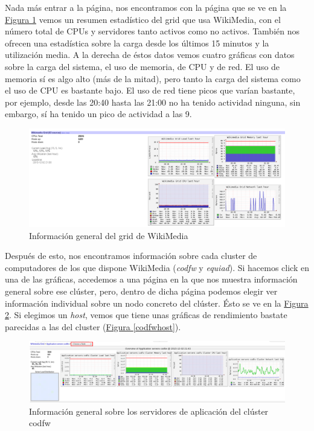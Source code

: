 \documentclass[10pt,a4paper,spanish]{article}
\numberwithin{equation}{section} %
\numberwithin{figure}{section} %
\numberwithin{table}{section} %
\begin{document}
Nada más entrar a la página, nos encontramos con la página que se ve en la \hyperref[wikimediainfo]{Figura \ref*{wikimediainfo}} vemos un resumen estadístico del grid que usa WikiMedia, con el número total de CPUs y servidores tanto activos como no activos. También nos ofrecen una estadística sobre la carga desde los últimos 15 minutos y la utilización media. A la derecha de éstos datos vemos cuatro gráficas con datos sobre la carga del sistema, el uso de memoria, de CPU y de red. El uso de memoria sí es algo alto (más de la mitad), pero tanto la carga del sistema como el uso de CPU es bastante bajo. El uso de red tiene picos que varían bastante, por ejemplo, desde las 20:40 hasta las 21:00 no ha tenido actividad ninguna, sin embargo, sí ha tenido un pico de actividad a las 9.

\begin{figure}[!h]
    \centering
    \includegraphics[width=1\textwidth]{3_50}
    \caption{Información general del grid de WikiMedia}
    \label{wikimediainfo}
\end{figure}

Después de esto, nos encontramos información sobre cada cluster de computadores de los que dispone WikiMedia (\textit{codfw} y \textit{equiad}). Si hacemos click en una de las gráficas, accedemos a una página en la que nos muestra información general sobre ese clúster, pero, dentro de dicha página podemos elegir ver información individual sobre un nodo concreto del clúster. Ésto se ve en la \hyperref[codfw]{Figura \ref*{codfw}}. Si elegimos un \textit{host}, vemos que tiene unas gráficas de rendimiento bastate parecidas a las del cluster (\hyperref[codfwhost]{Figura \ref*{codfwhost}}).

\begin{figure}[!h]
    \centering
    \includegraphics[width=1\textwidth]{3_51}
    \caption{Información general sobre los servidores de aplicación del clúster codfw}
    \label{codfw}
\end{figure}
\end{document}
